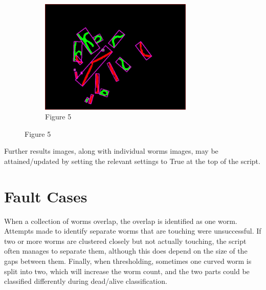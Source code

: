 \documentclass[a4paper,12pt]{article}
\begin{document}
\begin{figure}
    \centering
    \begin{subfigure}{0.8\textwidth}
        \centering
        \includegraphics[width=0.8\textwidth]{A01_step3.jpg}
        \captionsetup{labelformat=empty}
        \caption{Figure 5}
    \end{subfigure}
\end{figure}

\newpage
\noindent Further results images, along with individual worms images, may be attained/updated by setting the relevant settings to True at the top of the script.

\section*{Fault Cases}
When a collection of worms overlap, the overlap is identified as one worm. Attempts made to identify separate worms that are touching were unsuccessful. If two or more worms are clustered closely but not actually touching, the script often manages to separate them, although this does depend on the size of the gaps between them. Finally, when thresholding, sometimes one curved worm is split into two, which will increase the worm count, and the two parts could be classified differently during dead/alive classification.
\end{document}

